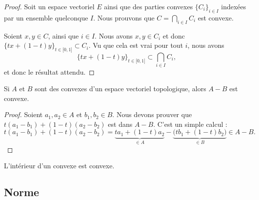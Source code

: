\begin{proof}
	Soit un espace vectoriel \( E\) ainsi que des parties convexes \( \{  C_i \}_{i\in I}\) indexées par un ensemble quelconque \( I\). Nous prouvons que \( C= \bigcap_{i\in I}C_i\) est convexe.

	Soient \( x, y\in C\), ainsi que \( i\in I\). Nous avons \( x,y\in C_i\) et donc \( \{ tx+(1-t)y \}_{t\in \mathopen[ 0 , 1 \mathclose]}\subset C_i\). Vu que cela est vrai pour tout \( i\), nous avons
	\begin{equation}
		\{ tx+(1-t)y \}_{t\in \mathopen[ 0 , 1 \mathclose]}\subset \bigcap_{i\in I}C_i,
	\end{equation}
	et donc le résultat attendu.
\end{proof}


\begin{proposition}	\label{PROPooJOXUooEZELna}
	Si \( A\) et \( B\) sont des convexes d'un espace vectoriel topologique, alors \( A-B\) est convexe.
\end{proposition}

\begin{proof}
	Soient \( a_1,a_2\in A\) et \( b_1,b_2\in B\). Nous devons prouver que \( t(a_1-b_1)+(1-t)(a_2-b_2)\) est dans \( A-B\). C'est un simple calcul :
	\begin{equation}
		t(a_1-b_1)+(1-t)(a_2-b_2)=\underbrace{ta_1+(1-t)a_2}_{\in A}-\underbrace{\big( tb_1+(1-t)b_2 \big)}_{\in B}\in A-B.
	\end{equation}
\end{proof}

\begin{lemma}		\label{LEMooEFCCooOuStrb}
	L'intérieur d'un convexe est convexe.
\end{lemma}

\ssdem

\subsection{Norme}

